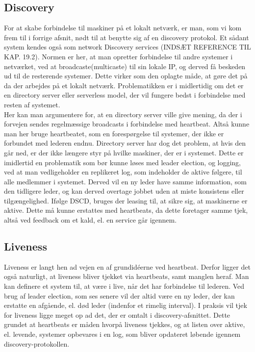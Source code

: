 \documentclass[a4paper,12pt]{article}
\begin{document}
\subsection*{Discovery} 
For at skabe forbindelse til maskiner på et lokalt netværk, er man, som vi kom frem til i forrige afsnit, nødt til at benytte sig af en discovery protokol. Et sådant system kendes også som network Discovery services (INDSÆT REFERENCE TIL KAP. 19.2). Normen er her, at man opretter forbindelse til andre systemer i netværket, ved at broadcaste(multicaste) til sin lokale IP, og derved få beskeden ud til de resterende systemer. Dette virker som den oplagte måde, at gøre det på da der arbejdes på et lokalt netværk. Problematikken er i midlertidig om det er en directory server eller serverless model, der vil fungere bedst i forbindelse med resten af systemet. 
\\
Her kan man argumentere for, at en directory server ville give mening, da der i forvejen sendes regelmæssige broadcasts i forbindelse med heartbeat. Altså kunne man her bruge heartbeatet, som en forespørgelse til systemer, der ikke er forbundet med lederen endnu.
Directory server har dog det problem, at hvis den går ned, er der ikke længere styr på hvilke maskiner, der er i systemet. Dette er imidlertid en problematik som bør kunne løses med leader election, og logging, ved at man vedligeholder en replikeret log, som indeholder de aktive følgere, til alle medlemmer i systemet. Derved vil en ny leder have samme information, som den tidligere leder, og kan derved overtage jobbet uden at miste konsistens eller tilgængelighed. Ifølge DSCD, bruges der leasing til, at sikre sig, at maskinerne er aktive. Dette må kunne erstattes med heartbeats, da dette foretager samme tjek, altså ved feedback om et kald, el. en service går igennem.

\subsection*{Liveness} 
Liveness er langt hen ad vejen en af grundidéerne ved heartbeat. Derfor ligger det også naturligt, at liveness bliver tjekket via heartbeats, samt manglen heraf. Man kan definere et system til, at være i live, når det har forbindelse til lederen. Ved brug af leader election, som ses senere vil der altid være en ny leder, der kan erstatte en afgående, el. død leder (indenfor et rimelig interval). I praksis vil tjek for liveness ligge meget op ad det, der er omtalt i discovery-afsnittet. 
Dette grundet at heartbeats er måden hvorpå liveness tjekkes, og at listen over aktive, el. levende, systemer opbevares i en log, som bliver opdateret løbende igennem discovery-protokollen.
\end{document}
